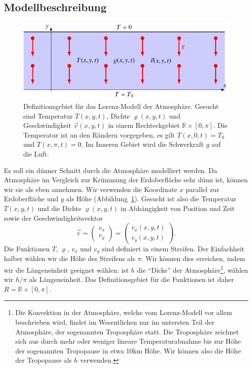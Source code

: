 \subsection{Modellbeschreibung}
\begin{figure}
\centering
\includegraphics{chapters/2/lorenz-definition.pdf}
\caption{Definitionsgebiet für das Lorenz-Modell der Atmosphäre.
Gesucht sind Temperatur $T(x,y,t)$, Dichte $\varrho(x,y,t)$ und
Geschwindigkeit $\vec{v}(x,y,t)$ in einem Rechteckgebiet
$\mathbb R\times [0,\pi]$.
Die Temperatur ist an den Rändern vorgegeben, es gilt
$T(x,0,t)=T_0$ und $T(x,\pi,t)=0$.
Im Inneren Gebiet wird die Schwerkraft $g$ auf die Luft.
\label{skript:lorenzmodell definitionsgebiet}}
\end{figure}
Es soll ein dünner Schnitt durch die Atmosphäre modelliert werden.
Da Atmosphäre im Vergleich zur Krümmung der Erdoberfläche sehr dünn ist,
können wir sie als eben annehmen.
Wir verwenden die Koordinate $x$ parallel zur Erdoberfläche und $y$ als Höhe
(Abbildung~\ref{skript:lorenzmodell definitionsgebiet}).
Gesucht ist also die Temperatur $T(x,y,t)$ und die Dichte $\varrho(x,y,t)$
in Abhängigkeit von Position und Zeit sowie der Geschwindigkeitsvektor
\[
\vec v
=
\begin{pmatrix}v_x\\v_y\end{pmatrix}
=
\begin{pmatrix}v_x(x,y,t)\\v_y(x,y,t)\end{pmatrix}.
\]
Die Funktionen $T$, $\varrho$, $v_x$ und $v_y$ sind definiert in einem
Streifen.
Der Einfachheit halber wählen wir die Höhe des Streifens als $\pi$.
Wir können dies erreichen, indem wir die Längeneinheit geeignet wählen:
ist $h$ die ``Dicke'' der Atmosphäre\footnote{Die Konvektion in der Atmosphäre,
welche vom Lorenz-Modell vor allem beschrieben wird, findet im Wesentlichen
nur im untersten Teil der Atmosphäre, der sogenannten Troposphäre statt.
Die Troposphäre zeichnet sich aus durch mehr oder weniger lineare
Temperaturabnahme bis zur Höhe der sogenannten Tropopause in etwa
10km Höhe.
Wir können also die Höhe der Tropopause als $h$ verwenden.}, wählen wir
$h/\pi$ als Längeneinheit.
Das Definitionsgebiet für die Funktionen ist daher $R=\mathbb R\times [0,\pi]$.

